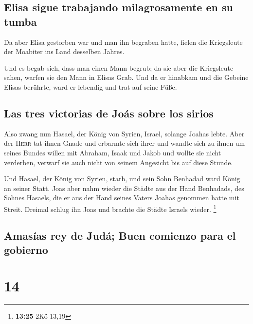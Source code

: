 \hypertarget{elisa-sigue-trabajando-milagrosamente-en-su-tumba}{%
\subsection{Elisa sigue trabajando milagrosamente en su
tumba}\label{elisa-sigue-trabajando-milagrosamente-en-su-tumba}}

 Da aber Elisa gestorben war und man ihn begraben hatte,
fielen die Kriegsleute der Moabiter ins Land desselben Jahres.

 Und es begab sich, dass man einen Mann begrub; da sie
aber die Kriegsleute sahen, warfen sie den Mann in Elisas Grab. Und da
er hinabkam und die Gebeine Elisas berührte, ward er lebendig und trat
auf seine Füße.

\hypertarget{las-tres-victorias-de-jouxe1s-sobre-los-sirios}{%
\subsection{Las tres victorias de Joás sobre los
sirios}\label{las-tres-victorias-de-jouxe1s-sobre-los-sirios}}

 Also zwang nun Hasael, der König von Syrien, Israel,
solange Joahas lebte.  Aber der \textsc{Herr} tat ihnen
Gnade und erbarmte sich ihrer und wandte sich zu ihnen um seines Bundes
willen mit Abraham, Isaak und Jakob und wollte sie nicht verderben,
verwarf sie auch nicht von seinem Angesicht bis auf diese Stunde.

 Und Hasael, der König von Syrien, starb, und sein Sohn
Benhadad ward König an seiner Statt.  Joas aber nahm
wieder die Städte aus der Hand Benhadads, des Sohnes Hasaels, die er aus
der Hand seines Vaters Joahas genommen hatte mit Streit. Dreimal schlug
ihn Joas und brachte die Städte Israels wieder. \footnote{\textbf{13:25}
  2Kö 13,19}

\hypertarget{amasuxedas-rey-de-juduxe1-buen-comienzo-para-el-gobierno}{%
\subsection{Amasías rey de Judá; Buen comienzo para el
gobierno}\label{amasuxedas-rey-de-juduxe1-buen-comienzo-para-el-gobierno}}

\hypertarget{section-13}{%
\section{14}\label{section-13}}


